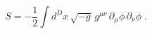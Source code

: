 \begin{equation}
S
=
-
\frac{1}{2}
\int
d^{D} x
\,
\sqrt{-g}
\,
g^{\mu \nu}
\,
\partial_{\mu} \phi
\, 
\partial_{\nu} \phi
\; .
\label{eq:massless_scalar_action}
\end{equation}

